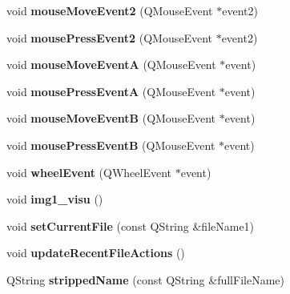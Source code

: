 \begin{DoxyCompactItemize}
\item 
\hypertarget{classofeli_1_1_image_viewer_af69f69ea675d1d17276d33cbbd589c57}{void {\bfseries mouse\-Move\-Event2} (Q\-Mouse\-Event $\ast$event2)}\label{classofeli_1_1_image_viewer_af69f69ea675d1d17276d33cbbd589c57}

\item 
\hypertarget{classofeli_1_1_image_viewer_a24e7412d42c958a36f5ed592dc38efda}{void {\bfseries mouse\-Press\-Event2} (Q\-Mouse\-Event $\ast$event2)}\label{classofeli_1_1_image_viewer_a24e7412d42c958a36f5ed592dc38efda}

\item 
\hypertarget{classofeli_1_1_image_viewer_aa38752ad9f824765ae26547889419031}{void {\bfseries mouse\-Move\-Event\-A} (Q\-Mouse\-Event $\ast$event)}\label{classofeli_1_1_image_viewer_aa38752ad9f824765ae26547889419031}

\item 
\hypertarget{classofeli_1_1_image_viewer_a438b7db35e4df44911a3d4e028097715}{void {\bfseries mouse\-Press\-Event\-A} (Q\-Mouse\-Event $\ast$event)}\label{classofeli_1_1_image_viewer_a438b7db35e4df44911a3d4e028097715}

\item 
\hypertarget{classofeli_1_1_image_viewer_a079ab6a0848555c29d77625fd14f194f}{void {\bfseries mouse\-Move\-Event\-B} (Q\-Mouse\-Event $\ast$event)}\label{classofeli_1_1_image_viewer_a079ab6a0848555c29d77625fd14f194f}

\item 
\hypertarget{classofeli_1_1_image_viewer_ab7d1d3b695aec628ae3e4b96a4592a7a}{void {\bfseries mouse\-Press\-Event\-B} (Q\-Mouse\-Event $\ast$event)}\label{classofeli_1_1_image_viewer_ab7d1d3b695aec628ae3e4b96a4592a7a}

\item 
\hypertarget{classofeli_1_1_image_viewer_a5ef1ce66a902b2127e0e21b91c5c6063}{void {\bfseries wheel\-Event} (Q\-Wheel\-Event $\ast$event)}\label{classofeli_1_1_image_viewer_a5ef1ce66a902b2127e0e21b91c5c6063}

\item 
\hypertarget{classofeli_1_1_image_viewer_afb3c30ac1376971b792833a882ea23c6}{void {\bfseries img1\-\_\-visu} ()}\label{classofeli_1_1_image_viewer_afb3c30ac1376971b792833a882ea23c6}

\item 
\hypertarget{classofeli_1_1_image_viewer_a31b5970a4677140fffa7175952f8df10}{void {\bfseries set\-Current\-File} (const Q\-String \&file\-Name1)}\label{classofeli_1_1_image_viewer_a31b5970a4677140fffa7175952f8df10}

\item 
\hypertarget{classofeli_1_1_image_viewer_a9621347a448d8c9838f7ccbb07e92be1}{void {\bfseries update\-Recent\-File\-Actions} ()}\label{classofeli_1_1_image_viewer_a9621347a448d8c9838f7ccbb07e92be1}

\item 
\hypertarget{classofeli_1_1_image_viewer_aaed27c02206280896aaafef81749f018}{Q\-String {\bfseries stripped\-Name} (const Q\-String \&full\-File\-Name)}\label{classofeli_1_1_image_viewer_aaed27c02206280896aaafef81749f018}

\end{DoxyCompactItemize}
